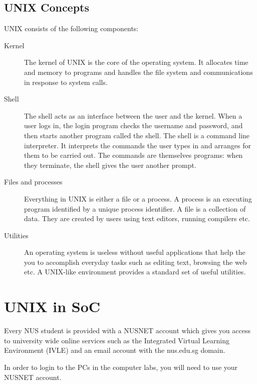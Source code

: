 \subsection{UNIX Concepts}
UNIX consists of the following components:
\begin{description}
\item[Kernel] The kernel of UNIX is the core of the operating system. It
allocates time and memory to programs and handles the file system and
communications in response to system calls.  
\item[Shell] The shell acts as an interface between the user and the kernel.
When a user logs in, the login program checks the username and password, and
then starts another program called the shell.   The shell is a command line
interpreter. It interprets the commands the user types in and arranges for them
to be carried out. The commands are themselves programs: when they terminate,
the shell gives the user another prompt.  
\item[Files and processes] Everything in UNIX is either a file or a process.  A
process is an executing program identified by a unique process identifier.  A
file is a collection of data. They are created by users using text editors,
running compilers etc.
\item[Utilities] An operating system is useless without useful applications that
help the you to accomplish everyday tasks such as editing text, browsing the web
etc.  A UNIX-like environment provides a standard set of useful utilities.  
\end{description}

\section{UNIX in SoC}

Every NUS student is provided with a NUSNET account which gives you access to
university wide online services such as the Integrated Virtual Learning
Environment (IVLE) and an email account with the nus.edu.sg domain. 

In order to login to the PCs in the computer labs, you will need to use your
NUSNET account.   


